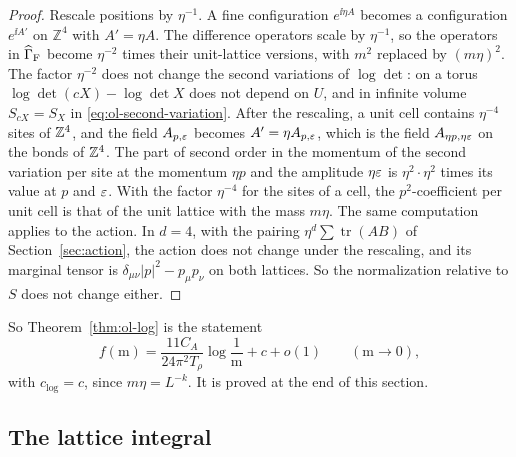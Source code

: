 \begin{proof}
Rescale positions by $\eta^{-1}$. A fine configuration $e^{\ii\eta A}$ becomes a configuration $e^{\ii A'}$ on $\mathbb Z^4$ with $A'=\eta A$. The difference operators scale by $\eta^{-1}$, so the operators in $\widehat\Gamma_{\rm F}$ become $\eta^{-2}$ times their unit-lattice versions, with $m^2$ replaced by $(m\eta)^2$. The factor $\eta^{-2}$ does not change the second variations of $\log\det$: on a torus $\log\det(cX)-\log\det X$ does not depend on $U$, and in infinite volume $S_{cX}=S_X$ in \eqref{eq:ol-second-variation}. After the rescaling, a unit cell contains $\eta^{-4}$ sites of $\mathbb Z^4$, and the field $A_{p,\varepsilon}$ becomes $A'=\eta A_{p,\varepsilon}$, which is the field $A_{\eta p,\eta\varepsilon}$ on the bonds of $\mathbb Z^4$. The part of second order in the momentum of the second variation per site at the momentum $\eta p$ and the amplitude $\eta\varepsilon$ is $\eta^2\cdot\eta^2$ times its value at $p$ and $\varepsilon$. With the factor $\eta^{-4}$ for the sites of a cell, the $p^2$-coefficient per unit cell is that of the unit lattice with the mass $m\eta$. The same computation applies to the action. In $d=4$, with the pairing $\eta^d\sum\operatorname{tr}(AB)$ of Section~\ref{sec:action}, the action does not change under the rescaling, and its marginal tensor is $\delta_{\mu\nu}|p|^2-p_\mu p_\nu$ on both lattices. So the normalization relative to $S$ does not change either.
\end{proof}

So Theorem~\ref{thm:ol-log} is the statement
\begin{equation}\label{eq:ol-f-asymptotics}
f(\mathrm m)=\frac{11C_A}{24\pi^2T_\rho}\log\frac1{\mathrm m}+c+o(1)\qquad(\mathrm m\to0),
\end{equation}
with $c_{\log}=c$, since $m\eta=L^{-k}$. It is proved at the end of this section.

\subsection{The lattice integral}\label{subsec:ol-lattice-integral}

